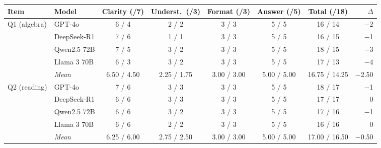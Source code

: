 \begin{tabular}{@{}ll cccc c r@{}}
\toprule
Item & Model & Clarity (/7) & Underst.\ (/3) & Format (/3) & Answer (/5) & Total (/18) & $\Delta$ \\
\midrule
\multirow{4}{*}{Q1 (algebra)} & GPT-4o & 6 / 4 & 2 / 2 & 3 / 3 & 5 / 5 & 16 / 14 & $-$2 \\
 & DeepSeek-R1 & 7 / 6 & 1 / 1 & 3 / 3 & 5 / 5 & 16 / 15 & $-$1 \\
 & Qwen2.5 72B & 7 / 5 & 3 / 2 & 3 / 3 & 5 / 5 & 18 / 15 & $-$3 \\
 & Llama 3 70B & 6 / 3 & 3 / 2 & 3 / 3 & 5 / 5 & 17 / 13 & $-$4 \\
\cmidrule(l){2-8} & \textit{Mean} & 6.50 / 4.50 & 2.25 / 1.75 & 3.00 / 3.00 & 5.00 / 5.00 & 16.75 / 14.25 & $-$2.50 \\
\midrule
\multirow{4}{*}{Q2 (reading)} & GPT-4o & 7 / 6 & 3 / 3 & 3 / 3 & 5 / 5 & 18 / 17 & $-$1 \\
 & DeepSeek-R1 & 6 / 6 & 3 / 3 & 3 / 3 & 5 / 5 & 17 / 17 & 0 \\
 & Qwen2.5 72B & 6 / 6 & 3 / 2 & 3 / 3 & 5 / 5 & 17 / 16 & $-$1 \\
 & Llama 3 70B & 6 / 6 & 2 / 2 & 3 / 3 & 5 / 5 & 16 / 16 & 0 \\
\cmidrule(l){2-8} & \textit{Mean} & 6.25 / 6.00 & 2.75 / 2.50 & 3.00 / 3.00 & 5.00 / 5.00 & 17.00 / 16.50 & $-$0.50 \\
\bottomrule
\end{tabular}
